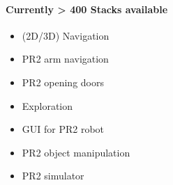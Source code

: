 \lyxframeend{}


\lyxframeend{}


\framesubtitle{Currently > 400 Stacks available}

\begin{minipage}[t]{0.45\textwidth}%
\begin{itemize}
\item (2D/3D) Navigation 
\item PR2 arm navigation
\item PR2 opening doors 
\item Exploration
\item GUI for PR2 robot
\item PR2 object manipulation 
\item PR2 simulator\end{itemize}
%
\end{minipage}%
